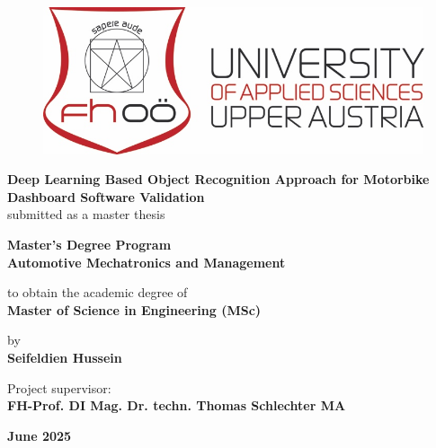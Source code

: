 \begin{titlepage}
    \begin{center}
        \vspace*{0.5cm}
        
        \begin{figure}
            \centering
            \includegraphics[width=0.75\linewidth]{Figures/FH_Logo.png}
        \end{figure}
        
        \Huge\textbf{Deep Learning Based Object Recognition Approach for Motorbike Dashboard Software Validation}\\
        
        \vspace{0.5cm}
        \large{submitted as a master thesis}\\
        
        \vfill
        
        \textbf{Master's Degree Program}\\
        \textbf{Automotive Mechatronics and Management}\\
        
        \vspace{0.5cm}
        
        to obtain the academic degree of\\
        \textbf{Master of Science in Engineering (MSc)}\\
        
        \vfill
        
        by\\
        \textbf{Seifeldien Hussein}\\
        
        \vfill
        
        Project supervisor:\\
        \textbf{FH-Prof. DI Mag. Dr. techn. Thomas Schlechter MA} \\ 
        
        \vspace{0.8cm}
        
         \textbf{June 2025}
        
    \end{center}
\end{titlepage}
